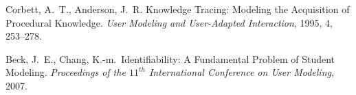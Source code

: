 \documentclass[11pt,letterpaper]{article}
\begin{document}
\begin{thebibliography}{9}

  Corbett, A.\ T., Anderson, J.\ R. Knowledge Tracing:  Modeling 
the Acquisition of Procedural Knowledge.  \emph{User Modeling and
 User-Adapted Interaction}, 1995, 4, 253--278.

  Beck, J.\ E., Chang, K.-m.\ Identifiability: A Fundamental Problem of
  Student Modeling.
  \emph{Proceedings of the $11^{th}$ International Conference on User 
    Modeling}, 2007.



\end{thebibliography}
\end{document}
